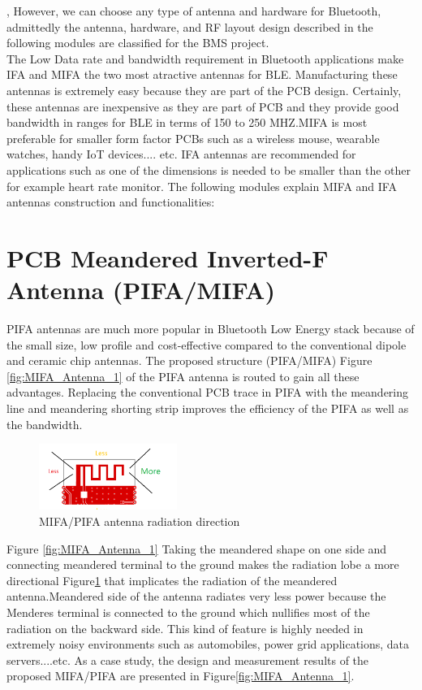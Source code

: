 \indent, However, we can choose any type of antenna and hardware for Bluetooth, admittedly the antenna, hardware, and RF layout design described in the following modules are classified for the BMS project.\\
\indent The Low Data rate and bandwidth requirement in Bluetooth applications make IFA and MIFA the two most atractive antennas for BLE.  Manufacturing these antennas is extremely easy because they are part of the PCB design. Certainly, these antennas are inexpensive as they are part of PCB and they provide good bandwidth in ranges for BLE in terms of 150 to 250 MHZ.MIFA is most preferable for smaller form factor PCBs such as a wireless mouse, wearable watches, handy IoT devices.... etc. IFA antennas are recommended for applications such as one of the dimensions is needed to be smaller than the other for example heart rate monitor.
The following modules explain MIFA and IFA antennas construction and functionalities:

\section{PCB Meandered Inverted-F Antenna (PIFA/MIFA)}

PIFA antennas are much more popular in Bluetooth Low Energy stack because of the small size, low profile and cost-effective compared to the conventional dipole and ceramic chip antennas.
The proposed structure (PIFA/MIFA) Figure \ref{fig:MIFA_Antenna_1} of the PIFA antenna is routed to gain all these advantages.
Replacing the conventional PCB trace in PIFA with the meandering line and meandering shorting strip
improves the efficiency of the PIFA as well as the bandwidth. 
\begin{figure}[h]
	\centering
	\includegraphics[width=0.4\textwidth]{Chap03/Figures/MIFA_Antenna_radiation_direction.PNG}
	\caption{MIFA/PIFA antenna radiation direction}
	\label{fig:MIFA_RADIATION_DIRECTION}
\end{figure}

Figure \ref{fig:MIFA_Antenna_1} Taking the meandered shape on one side and connecting meandered terminal to the ground makes the radiation lobe a more directional Figure\ref{fig:MIFA_RADIATION_DIRECTION} that implicates the radiation of the meandered antenna.Meandered side of the antenna radiates very less power because the Menderes terminal is connected to the ground which nullifies most of the radiation on the backward side. This kind of feature is highly needed in extremely noisy environments such as automobiles, power grid applications, data servers....etc.
As a case study, the design and measurement results of the
proposed MIFA/PIFA are presented \cite{PIFA2017Cheuk} in Figure\ref{fig:MIFA_Antenna_1}.



